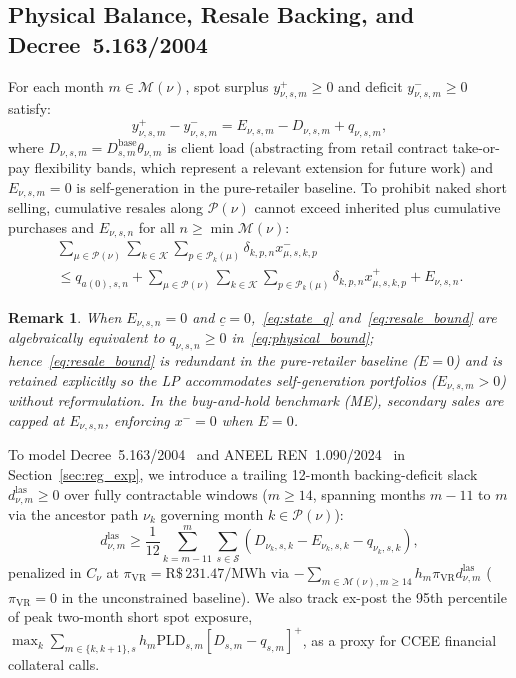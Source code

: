 \documentclass[10pt,journal]{IEEEtran}
\newtheorem{remark}{Remark}
\begin{document}
\subsection{Physical Balance, Resale Backing, and Decree~5.163/2004}
For each month $m \in \mathcal{M}(\nu)$, spot surplus $y^+_{\nu,s,m} \ge 0$ and deficit $y^-_{\nu,s,m} \ge 0$ satisfy:
\begin{equation}
y^+_{\nu,s,m} - y^-_{\nu,s,m} = E_{\nu,s,m} - D_{\nu,s,m} + q_{\nu,s,m},
\label{eq:phys_balance}
\end{equation}
where $D_{\nu,s,m} = D^{\text{base}}_{s,m} \theta_{\nu,m}$ is client load (abstracting from retail contract take-or-pay flexibility bands, which represent a relevant extension for future work) and $E_{\nu,s,m} = 0$ is self-generation in the pure-retailer baseline. To prohibit naked short selling, cumulative resales along $\mathcal{P}(\nu)$ cannot exceed inherited plus cumulative purchases and $E_{\nu,s,n}$ for all $n \ge \min \mathcal{M}(\nu)$:
\begin{multline}
\sum_{\mu \in \mathcal{P}(\nu)} \sum_{k \in \mathcal{K}} \sum_{p \in \mathcal{P}_k(\mu)} \delta_{k,p,n} x^-_{\mu,s,k,p} \\
\le q_{a(0),s,n} + \sum_{\mu \in \mathcal{P}(\nu)} \sum_{k \in \mathcal{K}} \sum_{p \in \mathcal{P}_k(\mu)} \delta_{k,p,n} x^+_{\mu,s,k,p} + E_{\nu,s,n}.
\label{eq:resale_bound}
\end{multline}

\begin{remark}
When $E_{\nu,s,n} = 0$ and $\underline{c} = 0$,~\eqref{eq:state_q} and~\eqref{eq:resale_bound} are algebraically equivalent to $q_{\nu,s,n} \ge 0$ in~\eqref{eq:physical_bound}; hence~\eqref{eq:resale_bound} is redundant in the pure-retailer baseline ($E=0$) and is retained explicitly so the LP accommodates self-generation portfolios ($E_{\nu,s,m} > 0$) without reformulation. In the buy-and-hold benchmark (ME), secondary sales are capped at $E_{\nu,s,n}$, enforcing $x^- = 0$ when $E = 0$.
\end{remark}

To model Decree~5.163/2004~\cite{Decreto5163_2004} and ANEEL REN~1.090/2024~\cite{ANEEL_REN1090_2024} in Section~\ref{sec:reg_exp}, we introduce a trailing 12-month backing-deficit slack $d^{\text{las}}_{\nu,m} \ge 0$ over fully contractable windows ($m \ge 14$, spanning months $m-11$ to $m$ via the ancestor path $\nu_{k}$ governing month $k \in \mathcal{P}(\nu)$):
\begin{equation}
d^{\text{las}}_{\nu,m} \ge \frac{1}{12} \sum_{k=m-11}^{m} \sum_{s \in \mathcal{S}} \left( D_{\nu_k, s, k} - E_{\nu_k, s, k} - q_{\nu_k, s, k} \right),
\label{eq:lastro_12m}
\end{equation}
penalized in $C_\nu$ at $\pi_{\text{VR}} = \text{R\$}\,231.47/\text{MWh}$ via $-\sum_{m \in \mathcal{M}(\nu), m \ge 14} h_m \pi_{\text{VR}} d^{\text{las}}_{\nu,m}$ ($\pi_{\text{VR}} = 0$ in the unconstrained baseline). We also track ex-post the 95th percentile of peak two-month short spot exposure, $\max_{k} \sum_{m \in \{k, k+1\}, s} h_m \text{PLD}_{s,m} [D_{s,m} - q_{s,m}]^+$, as a proxy for CCEE financial collateral calls.
\end{document}

